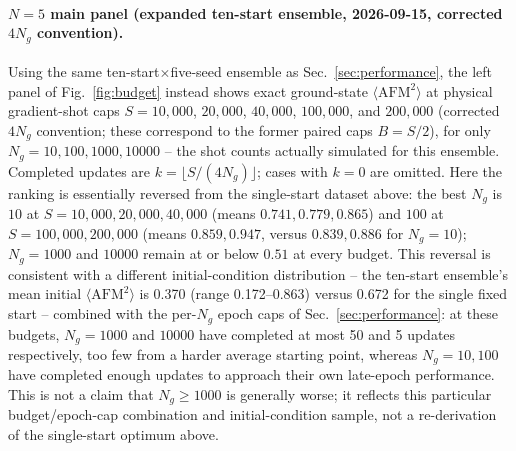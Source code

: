\documentclass[11pt]{article}
\begin{document}
\paragraph{$N=5$ main panel (expanded ten-start ensemble, 2026-09-15, corrected
$4N_g$ convention).}
Using the same ten-start$\times$five-seed ensemble as Sec.~\ref{sec:performance}, the
left panel of Fig.~\ref{fig:budget} instead shows exact ground-state
$\langle\mathrm{AFM}^2\rangle$ at physical gradient-shot caps $S=10{,}000$,
$20{,}000$, $40{,}000$, $100{,}000$, and $200{,}000$ (corrected $4N_g$ convention;
these correspond to the former paired caps $B=S/2$), for only
$N_g=10,100,1000,10000$ -- the shot counts actually simulated for this ensemble.
Completed updates are $k=\lfloor S/(4N_g)\rfloor$; cases with $k=0$ are omitted.  Here
the ranking is essentially reversed from the single-start dataset above: the best
$N_g$ is $10$ at $S=10{,}000,20{,}000,40{,}000$ (means $0.741,0.779,0.865$) and $100$
at $S=100{,}000,200{,}000$ (means $0.859,0.947$, versus $0.839,0.886$ for $N_g=10$);
$N_g=1000$ and $10000$ remain at or below $0.51$ at every budget.  This reversal is
consistent with a different initial-condition distribution -- the ten-start
ensemble's mean initial $\langle\mathrm{AFM}^2\rangle$ is 0.370 (range
0.172--0.863) versus 0.672 for the single fixed start -- combined with the
per-$N_g$ epoch caps of Sec.~\ref{sec:performance}: at these budgets, $N_g=1000$ and
$10000$ have completed at most 50 and 5 updates respectively, too few from a harder
average starting point, whereas $N_g=10,100$ have completed enough updates to
approach their own late-epoch performance.  This is not a claim that $N_g\ge1000$ is
generally worse; it reflects this particular budget/epoch-cap combination and
initial-condition sample, not a re-derivation of the single-start optimum above.
\end{document}
